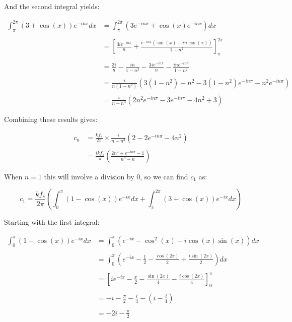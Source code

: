 \begin{appendices}
		And the second integral yields:

		\begin{align}
			\int_{\pi}^{2\pi} (3+\cos(x))e^{-inx} dx & = 
				\int_{\pi}^{2\pi} \left( 3e^{-inx} + \cos(x)e^{-inx} \right) dx \nonumber \\
			\nonumber \\
			& = \left[ \frac{3ie^{-inx}}{n} + \frac{e^{-inx}(\sin(x) - 
				in\cos(x))}{1 - n^{2}} \right]_{\pi}^{2\pi} \nonumber \\
			\nonumber \\
			& = \frac{3i}{n} - \frac{in}{1 - n^{2}} - \frac{3ie^{-in\pi}}{n} - 
				\frac{ine^{-in\pi}}{1 - n^{2}} \nonumber \\
			\nonumber \\
			& = \frac{i}{n(1-n^{2})} \left( 3(1-n^{2}) - n^{2} - 
				3(1-n^{2})e^{-in\pi} - n^{2}e^{-in\pi} \right) \nonumber \\
			\nonumber \\
			& = \frac{i}{n - n^{3}} \left( 2n^{2}e^{-in\pi} - 3e^{-in\pi} - 4n^{2} + 3 \right) \nonumber
		\end{align}

		Combining these results gives:

		\begin{align}
			c_{n} & = \frac{kf_{s}}{2\pi} \times \frac{i}{n - n^{3}} \left( 2 - 2e^{-in\pi} - 4n^{2} \right) 
				\nonumber \\
			\nonumber \\
			& = \frac{ikf_{s}}{\pi} \left( \frac{2n^{2} + e^{-in\pi} - 1}{n^{3} - n} \right) \nonumber
		\end{align}

		When $n = 1$ this will involve a division by 0, so we can find $c_{1}$ as:

		\[ c_{1} = \frac{kf_{s}}{2\pi} \left( \int_{0}^{\pi} (1-\cos(x))e^{-ix} dx
						      + \int_{\pi}^{2\pi} (3 + \cos(x))e^{-ix} dx 
						      \right) \]

		Starting with the first integral:
		
		\begin{align}
			\int_{0}^{\pi} (1-\cos(x))e^{-ix} dx & = \int_{0}^{\pi} \left( e^{-ix} - 
				\cos^{2}(x) + i\cos(x)\sin(x) \right) dx \nonumber \\
			\nonumber \\
			& = \int_{0}^{\pi} \left( e^{-ix} - \frac{1}{2} - 
				\frac{\cos(2x)}{2} + \frac{i\sin(2x)}{2} \right) dx \nonumber \\
			\nonumber \\
			& = \left[ ie^{-ix} - \frac{x}{2} - \frac{\sin(2x)}{4} - 
				\frac{i\cos(2x)}{4} \right]_{0}^{\pi} \nonumber \\
			\nonumber \\
			& = -i - \frac{\pi}{2} - \frac{i}{4} - \left( i - \frac{i}{4} \right) \nonumber \\
			\nonumber \\
			& = -2i - \frac{\pi}{2} \nonumber
		\end{align}


\end{appendices}
